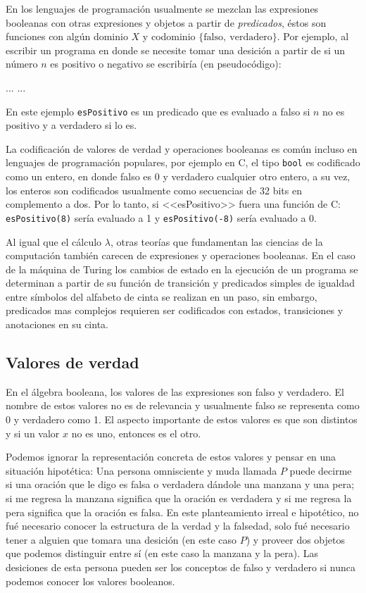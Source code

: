 En los lenguajes de programación usualmente se mezclan las expresiones booleanas con otras expresiones y objetos a partir de \emph{predicados}, éstos son funciones con algún dominio $ X $ y codominio $ \{ \mathrm{falso},\ \mathrm{verdadero} \} $. Por ejemplo, al escribir un programa en donde se necesite tomar una desición a partir de si un número $ n $ es positivo o negativo se escribiría (en pseudocódigo):

\begin{algorithmic}
  \STATE $ ... $
  \ELSE
  \STATE $ ... $
  \ENDIF
\end{algorithmic}

En este ejemplo \texttt{esPositivo} es un predicado que es evaluado a falso si $ n $ no es positivo y a verdadero si lo es.

La codificación de valores de verdad y operaciones booleanas es común incluso en lenguajes de programación populares, por ejemplo en C, el tipo \texttt{bool} es codificado como un entero, en donde falso es 0 y verdadero cualquier otro entero, a su vez, los enteros son codificados usualmente como secuencias de 32 bits en complemento a dos. Por lo tanto, si <<esPositivo>> fuera una función de C: \texttt{esPositivo(8)} sería evaluado a 1 y \texttt{esPositivo(-8)} sería evaluado a 0.

Al igual que el cálculo $ λ $, otras teorías que fundamentan las ciencias de la computación también carecen de expresiones y operaciones booleanas. En el caso de la máquina de Turing los cambios de estado en la ejecución de un programa se determinan a partir de su función de transición y predicados simples de igualdad entre símbolos del alfabeto de cinta se realizan en un paso, sin embargo, predicados mas complejos requieren ser codificados con estados, transiciones y anotaciones en su cinta.

\subsection{Valores de verdad}
\label{sec:valores-de-verdad}

En el álgebra booleana, los valores de las expresiones son falso y verdadero. El nombre de estos valores no es de relevancia y usualmente falso se representa como 0 y verdadero como 1. El aspecto importante de estos valores es que son distintos y si un valor $ x $ no es uno, entonces es el otro.

Podemos ignorar la representación concreta de estos valores y pensar en una situación hipotética: Una persona omnisciente y muda llamada $ P $ puede decirme si una oración que le digo es falsa o verdadera dándole una manzana y una pera; si me regresa la manzana significa que la oración es verdadera y si me regresa la pera significa que la oración es falsa. En este planteamiento irreal e hipotético, no fué necesario conocer la estructura de la verdad y la falsedad, solo fué necesario tener a alguien que tomara una desición (en este caso $ P $) y proveer dos objetos que podemos distinguir entre sí (en este caso la manzana y la pera). Las desiciones de esta persona pueden ser los conceptos de falso y verdadero si nunca podemos conocer los valores booleanos.

